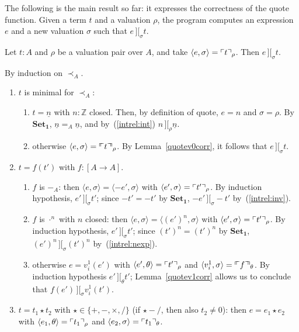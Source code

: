 \documentclass[numreferences]{kluwer}
\newcommand{\intII}{\,]\![}
\newcommand{\intrel}{\mathbin{\intII_{\rho}}}
\newcommand{\Z}{{\mathbb Z}}
\newcommand{\less}{\mathrel{\prec_A}}
\newcommand{\axiom}[1]{\ensuremath{\mathbf{#1}}}
\newcommand{\mlfnv}[2]{\ensuremath\ulcorner\!\!\ulcorner{#1}\urcorner\!\!\urcorner_{#2}}
\newcommand{\mlfn}[2]{\ensuremath\ulcorner{#1}\urcorner_{#2}}
\newcommand{\intrels}{\mathbin{\intII_{\sigma}}}
\newcommand{\intrelt}{\mathbin{\intII_{\theta}}}
\begin{document}
\begin{article}
The following is the main result so far: it expresses the correctness
of the quote function.
Given a term $t$ and a valuation $\rho$, the program computes an
expression $e$ and a new valuation $\sigma$ such that $e\intrels t$.

\begin{theorem}\label{quotecorrect}
Let $t:A$ and $\rho$ be a valuation pair over $A$, and take
$\langle e,\sigma\rangle=\mlfn{t}{\rho}$.  Then $e\intrels t$.
\end{theorem}
\begin{pf} By induction on $\less$.
\begin{enumerate}
\item $t$ is minimal for $\less$:
\begin{enumerate}
\item $t=\underline n$ with $n:\Z$ closed.  Then, by definition of
quote, $e=n$ and $\sigma=\rho$.  By \axiom{Set_1},
$\underline n=_A\underline n$, and by~(\ref{intrel:int})
$n\intrel\underline n$.
\item otherwise $\langle e,\sigma\rangle=\mlfnv{t}{\rho}$.  By
Lemma~\ref{quotev0corr}, it follows that $e\intrels t$.
\end{enumerate}
\item $t=f(t')$ with $f:[A\to A]$.
\begin{enumerate}
\item $f$ is $-_A$: then
$\langle e,\sigma\rangle=\langle -e',\sigma\rangle$ with
$\langle e',\sigma\rangle=\mlfn{t'}{\rho}$.  By induction hypothesis,
$e'\intrels t'$; since $-t'=-t'$ by \axiom{Set_1}, $-e'\intrels -t'$
by~(\ref{intrel:inv}).
\item $f$ is $\cdot^n$ with $n$ closed: then
$\langle e,\sigma\rangle=\langle (e')^n,\sigma\rangle$ with
$\langle e',\sigma\rangle=\mlfn{t'}{\rho}$.  By induction hypothesis,
$e'\intrels t'$; since $(t')^n=(t')^n$ by \axiom{Set_1},
$(e')^n\intrels(t')^n$ by~(\ref{intrel:nexp}).
\item otherwise $e=v^1_i(e')$ with
$\langle e',\theta\rangle=\mlfn{t'}{\rho}$ and
$\langle v^1_i,\sigma\rangle=\mlfnv{f}{\theta}$.  By induction
hypothesis $e'\intrelt t'$; Lemma~\ref{quotev1corr} allows us to
conclude that $f(e')\intrels v^1_i(t')$.
\end{enumerate}
\item $t=t_1\star t_2$ with $\star\in\{+,-,\times,/\}$ (if $\star-/$, then
also $t_2\neq 0$): then $e=e_1\star e_2$ with
$\langle e_1,\theta\rangle=\mlfn{t_1}{\rho}$ and
$\langle e_2,\sigma\rangle=\mlfn{t_1}{\theta}$.


\end{enumerate}
\end{pf}
\end{article}
\end{document}
